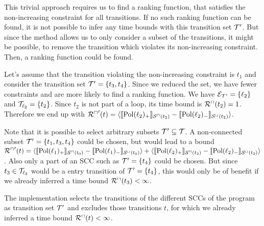 This trivial approach requires us to find a ranking function, that satisfies the non-increasing constraint for all transitions.
If no such ranking function can be found, it is not possible to infer any time bounds with this transition set $\mathcal{T}'$.
But since the method allows us to only consider a subset of the transitions, it might be possible, to remove the transition which violates its non-increasing constraint.
Then, a ranking function could be found.

Let's assume that the transition violating the non-increasing constraint is $t_1$ and consider the transition set $\mathcal{T}' = \lbrace t_3, t_4 \rbrace$.
Since we reduced the set, we have fewer constraints and are more likely to find a ranking function.
We have $\mathcal{E}_{\mathcal{T}'} = \lbrace \ell_2 \rbrace$ and $\mathcal{T}_{\ell_2} = \lbrace t_2 \rbrace$.
Since $t_2$ is not part of a loop, its time bound is ${\mathcal{R}^\sqcap}(t_2) = 1$.
Therefore we end up with ${\mathcal{R}^\sqcap}'(t) = \langle\llbracket \text{Pol}(\ell_2)_+ \rrbracket_{{\mathcal{S}^\sqcap}(t_2)} - \llbracket \text{Pol}(\ell_2)_- \rrbracket_{{\mathcal{S}^\sqcup}(t_2)}\rangle$.

Note that it is possible to select arbitrary subsets $\mathcal{T}' \subseteq \mathcal{T}$.
A non-connected subset $\mathcal{T}' = \lbrace t_1, t_3, t_4 \rbrace$ could be chosen, but would lead to a bound ${\mathcal{R}^\sqcap}'(t) = \langle\llbracket \text{Pol}(\ell_1)_+ \rrbracket_{{\mathcal{S}^\sqcap}(t_0)} - \llbracket \text{Pol}(\ell_1)_- \rrbracket_{{\mathcal{S}^\sqcup}(t_0)}\rangle + \langle\llbracket \text{Pol}(\ell_2)_+ \rrbracket_{{\mathcal{S}^\sqcap}(t_2)} - \llbracket \text{Pol}(\ell_2)_- \rrbracket_{{\mathcal{S}^\sqcup}(t_2)}\rangle$.
Also only a part of an SCC such as $\mathcal{T}' = \lbrace t_4 \rbrace$ could be chosen.
But since $t_3 \in \mathcal{T}_{\ell_3}$ would be a entry transition of $\mathcal{T}' = \lbrace t_4 \rbrace$, this would only be of benefit if we already inferred a time bound ${\mathcal{R}^\sqcap}(t_3) < \infty$.

The implementation selects the transitions of the different SCCs of the program as transition set $\mathcal{T}'$ and excludes those transitions $t$, for which we already inferred a time bound ${\mathcal{R}^\sqcap}(t) < \infty$.
